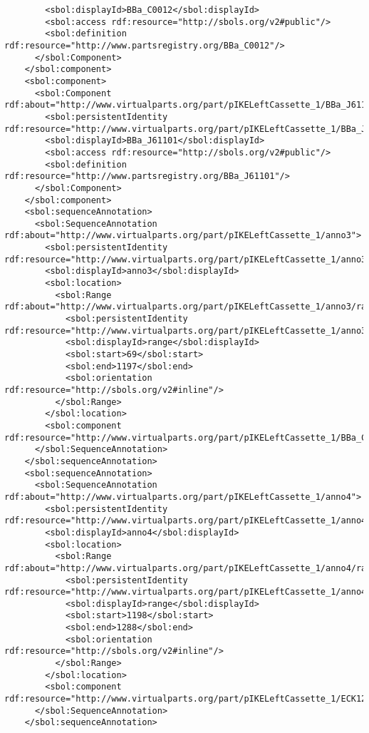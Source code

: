 \begin{lstlisting}
        <sbol:displayId>BBa_C0012</sbol:displayId>
        <sbol:access rdf:resource="http://sbols.org/v2#public"/>
        <sbol:definition rdf:resource="http://www.partsregistry.org/BBa_C0012"/>
      </sbol:Component>
    </sbol:component>
    <sbol:component>
      <sbol:Component rdf:about="http://www.virtualparts.org/part/pIKELeftCassette_1/BBa_J61101">
        <sbol:persistentIdentity rdf:resource="http://www.virtualparts.org/part/pIKELeftCassette_1/BBa_J61101"/>
        <sbol:displayId>BBa_J61101</sbol:displayId>
        <sbol:access rdf:resource="http://sbols.org/v2#public"/>
        <sbol:definition rdf:resource="http://www.partsregistry.org/BBa_J61101"/>
      </sbol:Component>
    </sbol:component>
    <sbol:sequenceAnnotation>
      <sbol:SequenceAnnotation rdf:about="http://www.virtualparts.org/part/pIKELeftCassette_1/anno3">
        <sbol:persistentIdentity rdf:resource="http://www.virtualparts.org/part/pIKELeftCassette_1/anno3"/>
        <sbol:displayId>anno3</sbol:displayId>
        <sbol:location>
          <sbol:Range rdf:about="http://www.virtualparts.org/part/pIKELeftCassette_1/anno3/range">
            <sbol:persistentIdentity rdf:resource="http://www.virtualparts.org/part/pIKELeftCassette_1/anno3/range"/>
            <sbol:displayId>range</sbol:displayId>
            <sbol:start>69</sbol:start>
            <sbol:end>1197</sbol:end>
            <sbol:orientation rdf:resource="http://sbols.org/v2#inline"/>
          </sbol:Range>
        </sbol:location>
        <sbol:component rdf:resource="http://www.virtualparts.org/part/pIKELeftCassette_1/BBa_C0012"/>
      </sbol:SequenceAnnotation>
    </sbol:sequenceAnnotation>
    <sbol:sequenceAnnotation>
      <sbol:SequenceAnnotation rdf:about="http://www.virtualparts.org/part/pIKELeftCassette_1/anno4">
        <sbol:persistentIdentity rdf:resource="http://www.virtualparts.org/part/pIKELeftCassette_1/anno4"/>
        <sbol:displayId>anno4</sbol:displayId>
        <sbol:location>
          <sbol:Range rdf:about="http://www.virtualparts.org/part/pIKELeftCassette_1/anno4/range">
            <sbol:persistentIdentity rdf:resource="http://www.virtualparts.org/part/pIKELeftCassette_1/anno4/range"/>
            <sbol:displayId>range</sbol:displayId>
            <sbol:start>1198</sbol:start>
            <sbol:end>1288</sbol:end>
            <sbol:orientation rdf:resource="http://sbols.org/v2#inline"/>
          </sbol:Range>
        </sbol:location>
        <sbol:component rdf:resource="http://www.virtualparts.org/part/pIKELeftCassette_1/ECK120029600"/>
      </sbol:SequenceAnnotation>
    </sbol:sequenceAnnotation>

\end{lstlisting}
